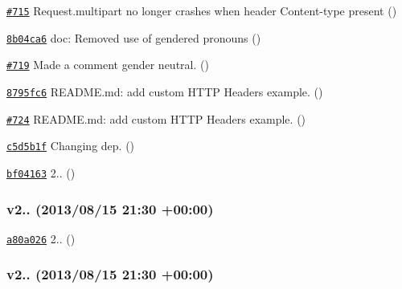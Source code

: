 \begin{DoxyItemize}
\item \href{https://github.com/mikeal/request/pull/715}{\tt \#715} Request.\+multipart no longer crashes when header \textquotesingle{}Content-\/type\textquotesingle{} present ()
\item \href{https://github.com/mikeal/request/commit/8b04ca6ad8d025c275e40b806a69112ac53bd416}{\tt 8b04ca6} doc\+: Removed use of gendered pronouns ()
\item \href{https://github.com/mikeal/request/pull/719}{\tt \#719} Made a comment gender neutral. ()
\item \href{https://github.com/mikeal/request/commit/8795fc68cce26b9a45d10db9eaffd4bc943aca3a}{\tt 8795fc6} R\+E\+A\+D\+M\+E.\+md\+: add custom H\+T\+T\+P Headers example. ()
\item \href{https://github.com/mikeal/request/pull/724}{\tt \#724} R\+E\+A\+D\+M\+E.\+md\+: add custom H\+T\+T\+P Headers example. ()
\item \href{https://github.com/mikeal/request/commit/c5d5b1fcf348e768943fe632a9a313d704d35c65}{\tt c5d5b1f} Changing dep. ()
\item \href{https://github.com/mikeal/request/commit/bf04163883fa9c62d4e1a9fdd64d6efd7723d5f8}{\tt bf04163} 2.. ()
\end{DoxyItemize}

\subsubsection*{v2.. (2013/08/15 21\+:30 +00\+:00)}


\begin{DoxyItemize}
\item \href{https://github.com/mikeal/request/commit/a80a026e362a9462d6948adc1b0d2831432147d2}{\tt a80a026} 2.. ()
\end{DoxyItemize}

\subsubsection*{v2.. (2013/08/15 21\+:30 +00\+:00)}


